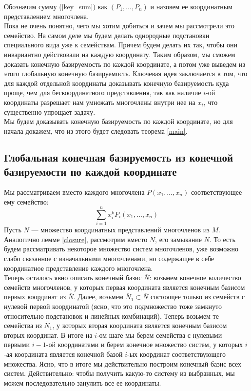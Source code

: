 \documentclass[12pt,a4paper]{article}
\begin{document}
    Обозначим сумму (\ref{key_sum}) как $(P_1,\ldots,P_n)$ и назовем ее координатным представлением многочлена.\\
    Пока не очень понятно, чего мы хотим добиться и зачем мы рассмотрели это семейство. На самом деле мы будем делать однородные подстановки специального вида уже к семействам. Причем будем делать их так, чтобы они инвариантно действовали на каждую координату. Таким образом, мы сможем доказать конечную базируемость по каждой координате, а потом уже выведем из этого глобальную конечную базируемость. Ключевая идея заключается в том, что для каждой отдельной координаты доказывать конечную базируемость куда проще, чем для бескоординатного представления, так как наличие $i$-ой координаты разрешает нам умножать многочлены внутри нее на $x_i$, что существенно упрощает задачу.\\

    Мы будем доказывать конечную базируемость по каждой координате, но для начала докажем, что из этого будет следовать теорема \ref{main}.

    \subsection{Глобальная конечная базируемость из конечной базируемости по каждой координате}
    Мы рассматриваем вместо каждого многочлена $P(x_1,\ldots,x_n)$ соответствующее ему семейство:
    $$\sum\limits_{i=1}^n x_i^k P_i(x_1,\ldots,x_n)$$ Пусть $N$ --- множество координатных представлений многочленов из $M$.
    Аналогично лемме \ref{closure}, рассмотрим вместо $N$, его замыкание $\overline{N}$. То есть будем рассматривать некоторое множество систем многочленов, уже возможно слабо связанное с изначальными многочленами, но содержащее в себе координатное представление каждого многочлена.\\
    Теперь осталось явно описать конечный базис $\overline{N}$: возьмем конечное количество семейств многочленов, у которых первая координата является конечным базисом первых координат из $\overline{N}$. Далее, возьмем $\overline{N}_1\subset \overline{N}$ состоящее только из семейств с нулевой первой координатой (ясно, что это подмножество тоже замкнуто относительно подстановок и линейных комбинаций). Теперь возьмем те семейства из $\overline{N}_1$, у которых вторая координата является конечным базисом вторых координат. В итоге на $i$-ом шаге мы берем семейства с нулевыми первыми $i-1$-ой координатами и берем конечное множество систем, у которых $i$-ая координата является конечной базой $i$-ых координат соответствующего множества. Ясно, что в итоге мы действительно построим конечный базис всех систем. Действительно: чтобы получить какую-то систему из выбранных, мы можем последовательно занулить все ее координаты.
\end{document}
